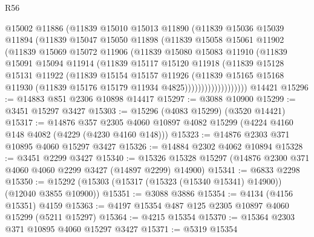 \begin{lexlean}{R56}
\begin{coremodule}
                  @15002
                  @11886
                  (@11839
                    @15010
                    @15013
                    @11890
                    (@11839
                      @15036
                      @15039
                      @11894
                      (@11839
                        @15047
                        @15050
                        @11898
                        (@11839
                          @15058
                          @15061
                          @11902
                          (@11839
                            @15069
                            @15072
                            @11906
                            (@11839
                              @15080
                              @15083
                              @11910
                              (@11839
                                @15091
                                @15094
                                @11914
                                (@11839
                                  @15117
                                  @15120
                                  @11918
                                  (@11839
                                    @15128
                                    @15131
                                    @11922
                                    (@11839
                                      @15154
                                      @15157
                                      @11926
                                      (@11839
                                        @15165
                                        @15168
                                        @11930
                                        (@11839 @15176 @15179 @11934 @4825)))))))))))))))))))
    @14421
@15296 := @14883 @851 @2306 @10898 @14417
@15297 := @3088 @10900
@15299 := @3451 @15297 @3427
@15303 := @15296 (@4083 @15299) (@3520 @14421)
@15317 := @14876
    @357
    @2305
    @4060
    @10897
    @4082
    @15299
    (@4224 @4160 @148 @4082 (@4229 (@4230 @4160 @148)))
@15323 := @14876 @2303 @371 @10895 @4060 @15297 @3427
@15326 := @14884 @2302 @4062 @10894
@15328 := @3451 @2299 @3427
@15340 := @15326 @15328 @15297 (@14876 @2300 @371 @4060 @4060 @2299 @3427 (@14897 @2299) @14900)
@15341 := @6833 @2298
@15350 := @15292 (@15303 (@15317 (@15323 (@15340 @15341) @14900)) (@12040 @3855 @10900))
@15351 := @3088 @3886
@15354 := @4134 (@4156 @15351) @4159
@15363 := @4197 @15354 @487 @125 @2305 @10897 @4060 @15299 (@5211 @15297)
@15364 := @4215 @15354
@15370 := @15364 @2303 @371 @10895 @4060 @15297 @3427
@15371 := @5319 @15354

\end{coremodule}
\end{lexlean}
